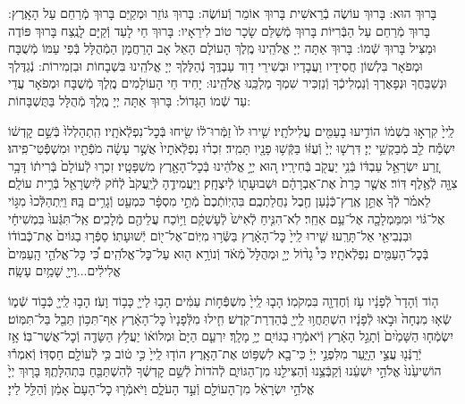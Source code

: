 \documentclass[twoside, openany, parskip=half, 11pt]{book}
\begin{document}
בָּרוּךְ הוּא:
בָּרוּךְ עוֹשֶׂה בְֿרֵאשִׁית בָּרוּךְ אוֹמֵר וְֿעוֹשֶׂה:
בָּרוּךְ גּוֹזֵר וּמְקַיֵּם בָּרוּךְ מְֿרַחֵם עַל הָאָֽרֶץ:
בָּרוּךְ מְֿרַחֵם עַל הַבְּֿרִיּוֹת בָּרוּךְ מְֿשַׁלֵּם שָׂכָר טוֹב לִירֵאָיו:
בָּרוּךְ חַי לָעַד וְֿקַיָּם לָנֶֽצַח בָּרוּךְ פּוֹדֶה וּמַצִּיל בָּרוּךְ שְֿׁמוֹ:
בָּרוּךְ אַתָּה יְיָ אֱלֹהֵֽינוּ מֶֽלֶךְ הָעוֹלָם הָאֵל אָב הָרַחֲמָן הַמְֿהֻלָּל בְּֿפִי עַמּוֹ מְֿשֻׁבָּח וּמְפֹאָר בִּלְשׁוֹן חֲסִידָיו וַעֲבָדָיו וּבְשִׁירֵי דָוִד עַבְדֶּֽךָ נְֿהַלֶּלְךָ יְיָ אֱלֹהֵֽינוּ בִּשְׁבָחוֹת וּבִזְמִירוֹת: נְֿגַדֶּלְךָ וּנְשַׁבֵּחֲךָ וּנְפָאֶרְךָ וְֿנַמְלִיכְֿךָ וְֿנַזְכִּיר שִׁמְךָ מַלְכֵּֽנוּ אֱלֹהֵֽינוּ:
יָחִיד חֵי הָעוֹלָמִים מֶֽלֶךְ מְֿשֻׁבָּח וּמְפֹאָר עֲדֵי עַד שְֿׁמוֹ הַגָּדוֹל: בָּרוּךְ אַתָּה יְיָ מֶֽלֶךְ מְֿהֻלָּל בַּתֻּשְׁבָּחוֹת:

לַֽייָ֙ קִרְא֣וּ בִשְׁמ֔וֹ
הוֹדִ֥יעוּ בָעַמִּ֖ים עֲלִילֹתָֽיו׃
שִׁ֤ירוּ לוֹ֙ זַמְּֿרוּ־ל֔וֹ שִׂ֖יחוּ בְּֿכׇל־נִפְלְֿאֹתָֽיו׃
הִֽתְהַלְלוּ֙ בְּֿשֵׁ֣ם קׇדְשׁ֔וֹ יִשְׂמַ֕ח לֵ֖ב מְֿבַקְשֵׁ֥י יְיָ׃
דִּרְשׁ֤וּ יְיָ֙ וְֿעֻזּ֔וֹ בַּקְּֿשׁ֥וּ פָנָ֖יו תָּמִֽיד׃
זִכְר֗וּ נִפְלְֿאֹתָיו֙ אֲשֶׁ֣ר עָשָׂ֔ה מֹפְֿתָ֖יו וּמִשְׁפְּֿֿטֵי־פִֽיהוּ׃
זֶ֚רַע יִשְׂרָאֵ֣ל עַבְדּ֔וֹ בְּֿנֵ֥י יַעֲקֹ֖ב בְּֿחִירָֽיו׃
ה֚וּא יְיָ֣ אֱלֹהֵ֔ינוּ בְּֿכׇל־הָאָ֖רֶץ מִשְׁפָּטָֽיו׃
זִכְר֤וּ לְֿעוֹלָם֙ בְּֿרִית֔וֹ דָּבָ֥ר צִוָּ֖ה לְֿאֶ֥לֶף דּֽוֹר׃
אֲשֶׁ֤ר כָּרַת֙ אֶת־אַבְרָהָ֔ם וּשְׁבוּעָת֖וֹ לְֿיִצְחָֽק׃
וַיַּעֲמִידֶ֤הָ לְֿיַֽעֲקֹב֙ לְֿחֹ֔ק לְֿיִשְׂרָאֵ֖ל בְּֿרִ֥ית עוֹלָֽם׃
לֵאמֹ֗ר לְֿךָ֙ אֶתֵּ֣ן אֶֽרֶץ־כְּֿנָ֔עַן חֶ֖בֶל נַחֲלַתְכֶֽם׃
בִּהְיֽוֹתְֿכֶם֙ מְֿתֵ֣י מִסְפָּ֔ר כִּמְעַ֖ט וְֿגָרִ֥ים בָּֽהּ׃
וַיִּֽתְהַלְּֿכוּ֙ מִגּ֣וֹי אֶל־גּ֔וֹי וּמִמַּמְלָכָ֖ה אֶל־עַ֥ם אַחֵֽר׃
לֹֽא־הִנִּ֤יחַ לְֿאִישׁ֙ לְֿעׇשְׁקָ֔ם וַיּ֥וֹכַח עֲלֵיהֶ֖ם מְֿלָכִֽים׃
אַֽל־תִּגְּֿעוּ֙ בִּמְשִׁיחָ֔י וּבִנְבִיאַ֖י אַל־תָּרֵֽעוּ׃
שִׁ֤ירוּ לַֽייָ֙ כׇּל־הָאָ֔רֶץ בַּשְּֿׂר֥וּ מִיּֽוֹם־אֶל־י֖וֹם יְֿשׁוּעָתֽוֹ׃
סַפְּֿר֤וּ בַגּוֹיִם֙ אֶת־כְּֿבוֹד֔וֹ בְּֿכׇל־הָעַמִּ֖ים נִפְלְֿאֹתָֽיו׃
כִּי֩ גָד֨וֹל יְיָ֤ וּמְהֻלָּל֙ מְֿאֹ֔ד וְֿנוֹרָ֥א ה֖וּא עַל־כׇּל־אֱלֹהִֽים׃
כִּ֠י כׇּל־אֱלֹהֵ֤י הָֽעַמִּים֙ אֱלִילִ֔ים...וַייָ֖ שָׁמַ֥יִם עָשָֽׂה׃

ה֤וֹד וְֿהָדָר֙ לְֿפָנָ֔יו עֹ֥ז וְֿחֶדְוָ֖ה בִּמְקֹמֽוֹ׃
הָב֤וּ לַֽייָ֙ מִשְׁפְּֿֿח֣וֹת עַמִּ֔ים הָב֥וּ לַייָ֖ כָּב֥וֹד וָעֹֽז׃
הָב֥וּ לַֽייָ֖ כְּֿב֣וֹד שְֿׁמ֑וֹ שְֿׂא֤וּ מִנְחָה֙ וּבֹ֣אוּ לְֿפָנָ֔יו
הִשְׁתַּחֲו֥וּ לַֽייָ֖ בְּֿהַדְרַת־קֹֽדֶשׁ׃ חִ֤ילוּ מִלְּֿפָנָיו֙ כׇּל־הָאָ֔רֶץ
אַף־תִּכּ֥וֹן תֵּבֵ֖ל בַּל־תִּמּֽוֹט׃ יִשְׂמְֿח֤וּ הַשָּׁמַ֙יִם֙ וְֿתָגֵ֣ל הָאָ֔רֶץ
וְֿיֹאמְֿר֥וּ בַגּוֹיִ֖ם יְיָ֥ מָלָֽךְ׃ יִרְעַ֤ם הַיָּם֙ וּמְלוֹא֔וֹ
יַעֲלֹ֥ץ הַשָּׂדֶ֖ה וְֿכׇל־אֲשֶׁר־בּֽוֹ׃ אָ֥ז יְֿרַנְּֿנ֖וּ עֲצֵ֣י הַיָּ֑עַר
מִלִּפְנֵ֣י יְיָ֔ כִּי־בָ֖א לִשְׁפּ֥וֹט אֶת־הָאָֽרֶץ׃ הוֹד֤וּ לַֽייָ֙ כִּ֣י ט֔וֹב
כִּ֥י לְֿעוֹלָ֖ם חַסְדּֽוֹ׃ וְֿאִמְר֕וּ הוֹשִׁיעֵ֙נוּ֙ אֱלֹהֵ֣י יִשְׁעֵ֔נוּ
וְֿקַבְּֿצֵ֥נוּ וְֿהַצִּילֵ֖נוּ מִן־הַגּוֹיִ֑ם לְֿהֹדוֹת֙ לְֿשֵׁ֣ם קׇדְשֶׁ֔ךָ
לְֿהִשְׁתַּבֵּ֖חַ בִּתְהִלָּתֶֽךָ׃ בָּר֤וּךְ יְיָ֙ אֱלֹהֵ֣י יִשְׂרָאֵ֔ל
מִן־הָעוֹלָ֖ם וְֿעַ֣ד הָעֹלָ֑ם וַיֹּאמְֿר֤וּ כׇל־הָעָם֙ אָמֵ֔ן וְֿהַלֵּ֖ל לַייָ׃\\
\end{document}
